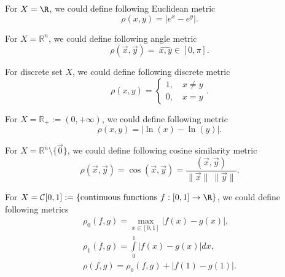 \Ex For $X = \R$, we could define following Euclidean metric
    \[
        \rho(x,y) = \left| e^x - e^y \right|.  
    \]
    
\Ex For $X=\mathbb{R}^n$, we could define following angle metric 
$$
    \rho(\vec{x},\vec{y})=\ \widehat{x,y}\in[0,\pi].
$$

\Ex For discrete set $X$, we could define following discrete metric  
$$
    \rho(x,y)=
    \begin{cases}
        1,\quad x\neq y\\
        0,\quad x=y
    \end{cases}.
$$

\Ex For $X=\mathbb{R}_+:=(0,+\infty)$, we could define following metric 
$$
    \rho(x,y)=|\ln(x)-\ln(y)|.
$$

\Ex For $X=\mathbb{R}^n\setminus \{\vec{0}\}$, we could define following cosine similarity metric 
$$
    \rho(\vec{x},\vec{y})=\cos{(\vec{x},\vec{y})}=\dfrac{(\vec{x},\vec{y})}{\|\vec{x}\| \ \|\vec{y}\|}.
$$
\Ex
    \par 
    For $X = \mathcal{C}[0,1] := \left\{\text{continuous functions } f: [0,1] \to \R\right\}$, we could define following metrics
    \[
            \begin{array}{c}
                \displaystyle\rho_0 (f,g) = \max\limits_{x \in [0,1]} |f(x) - g(x)|,\\
                \displaystyle\rho_1 (f,g) = \int\limits_{0}^1 |f(x) - g(x)|dx,\\
            \rho(f,g) = \rho_0(f,g) + |f(1) - g(1)|.
            \end{array}
    \]
